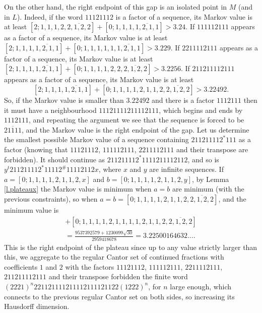 \documentclass[10pt]{amsart}
\numberwithin{equation}{section}
\theoremstyle{definition}
\begin{document}
On the other hand, the right endpoint of this gap is an isolated point in $M$ (and in $L$). Indeed, if the word $11121112$ is a factor of a sequence, its Markov value is at least $[2;1,1,1,2,\overline{2,1,2,2}]+[0;1,1,1,\overline{1,2,1,1}]>3.24$. If $111112111$ appears as a factor of a sequence, its Markov value is at least $[2;1,1,1,\overline{1,2,1,1}]+[0;1,1,1,1,1,\overline{1,2,1,1}]>3.229$. If $2211112111$ appears as a factor of a sequence, its Markov value is at least $[2;1,1,1,\overline{1,2,1,1}]+[0;1,1,1,1,2,2,\overline{2,1,2,2}]>3.2256$. If $211211112111$ appears as a factor of a sequence, its Markov value is at least 
$$[2;1,1,1,\overline{1,2,1,1}]+[0;1,1,1,1,2,1,1,2,\overline{2,1,2,2}]>3.22492.$$
So, if the Markov value is smaller than $3.22492$ and there is a factor
$1112111$ then it must have a neighbourhood $11121111211112111$, which begins
and ends by $1112111$, and repeating the argument we see that the sequence is
forced to be $\overline{21111}$, and the Markov value is the right endpoint of
the gap. Let us determine the smallest possible Markov value of a sequence
containing $211211112^*111$ as a factor (knowing that $11121112$, $111112111$,
$2211112111$ and their transpose are forbidden). It should continue as
$211211112^*1111211112112$, and so is $y^{t}211211112^{*}11112^{\#}11112112x$,
where $x$ and $y$ are infinite sequences. If $a=[0;1,1,1,1,2,1,1,2,x]$ and
$b=[0;1,1,1,1,2,1,1,2,y]$, by Lemma \ref{l.plateaux} the Markov value is minimum
when $a=b$ are minimum (with the previous constraints), so when
$a=b=[0;1,1,1,1,2,1,1,2,\overline{2,1,2,2}]$, and the minimum value is
\begin{multline*}
[2;1,1,1,1,2,1,1,2,\overline{2,1,2,2}]+[0;1,1,1,1,2,1,1,1,1,2,1,1,2,\overline{2,1,2,2}]\\
=\frac{9537392579+1230099\sqrt{30}}{2959418678}=3.22500164632....
\end{multline*}
This is the right endpoint of the plateau since up to any value strictly larger
than this, we aggregate to the regular Cantor set of continued fractions with
coefficients $1$ and $2$ with the factors $11121112$, $111112111$, $2211112111$,
$211211112111$ and their transpose forbidden the finite word $(2221)^n
221121111211112111121122(1222)^n$, for $n$ large enough, which connects to the
previous regular Cantor set on both sides, so increasing its Hausdorff
dimension. 
\end{document}

